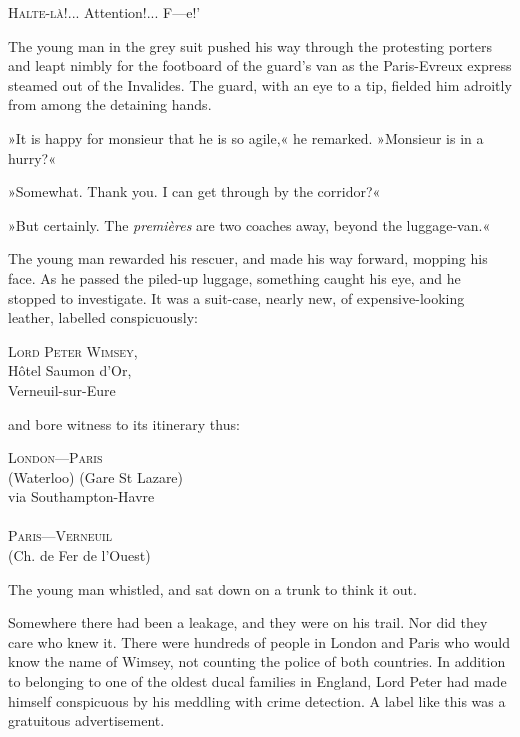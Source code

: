 
\lettrine[lines=4,ante=‘]{H}{alte-là!}... Attention!... F—e!'

\zz
The young man in the grey suit pushed his way through the protesting porters and leapt nimbly for the footboard of the guard's van as the Paris-Evreux express steamed out of the Invalides. The guard, with an eye to a tip, fielded him adroitly from among the detaining hands.

»It is happy for monsieur that he is so agile,« he remarked. »Monsieur is in a hurry?«

»Somewhat. Thank you. I can get through by the corridor?«

»But certainly. The \textit{premières} are two coaches away, beyond the luggage-van.«

The young man rewarded his rescuer, and made his way forward, mopping his face. As he passed the piled-up luggage, something caught his eye, and he stopped to investigate. It was a suit-case, nearly new, of expensive-looking leather, labelled conspicuously:

\vspace{-0.2cm}

\begin{center}
\textsc{Lord Peter Wimsey},\\
Hôtel Saumon d'Or,\\
Verneuil-sur-Eure
\end{center}

\vspace{-0.2cm}
\noindent and bore witness to its itinerary thus:
\vspace{-0.2cm}

\begin{center}
\textsc{London—Paris}\\
(Waterloo) (Gare St Lazare)\\
via Southampton-Havre\\
~\\
\textsc{Paris—Verneuil}\\
(Ch. de Fer de l'Ouest)
\end{center}

The young man whistled, and sat down on a trunk to think it out.

Somewhere there had been a leakage, and they were on his trail. Nor did they care who knew it. There were hundreds of people in London and Paris who would know the name of Wimsey, not counting the police of both countries. In addition to belonging to one of the oldest ducal families in England, Lord Peter had made himself conspicuous by his meddling with crime detection. A label like this was a gratuitous advertisement.

